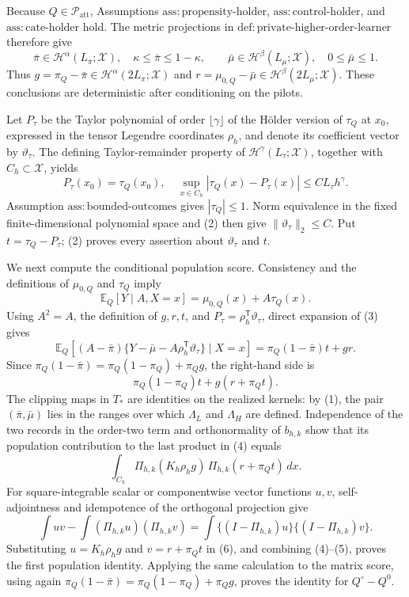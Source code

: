 Because \(Q\in\mathcal P_{\mathrm{att}}\), Assumptions \(\mathrm{ass{:}propensity\text{-}holder}\), \(\mathrm{ass{:}control\text{-}holder}\), and \(\mathrm{ass{:}cate\text{-}holder}\) hold.  The metric projections in \(\mathrm{def{:}private\text{-}higher\text{-}order\text{-}learner}\) therefore give
\[
 \bar\pi\in\mathcal H^\alpha(L_\pi;\mathcal X),\quad
 \kappa\le\bar\pi\le1-\kappa,
 \qquad
 \bar\mu\in\mathcal H^\beta(L_\mu;\mathcal X),\quad
 0\le\bar\mu\le1.
\tag{1}
\]
Thus \(g=\pi_Q-\bar\pi\in\mathcal H^\alpha(2L_\pi;\mathcal X)\) and \(r=\mu_{0,Q}-\bar\mu\in\mathcal H^\beta(2L_\mu;\mathcal X)\).  These conclusions are deterministic after conditioning on the pilots.

Let \(P_\tau\) be the Taylor polynomial of order \(\lfloor\gamma\rfloor\) of the H\"older version of \(\tau_Q\) at \(x_0\), expressed in the tensor Legendre coordinates \(\rho_h\), and denote its coefficient vector by \(\vartheta_\tau\).  The defining Taylor-remainder property of \(\mathcal H^\gamma(L_\tau;\mathcal X)\), together with \(C_h\subset\mathcal X\), yields
\[
 P_\tau(x_0)=\tau_Q(x_0),\quad
 \sup_{x\in C_h}|\tau_Q(x)-P_\tau(x)|\le C L_\tau h^\gamma.
\tag{2}
\]
Assumption \(\mathrm{ass{:}bounded\text{-}outcomes}\) gives \(|\tau_Q|\le1\).  Norm equivalence in the fixed finite-dimensional polynomial space and (2) then give \(\lVert\vartheta_\tau\rVert_2\le C\).  Put \(t=\tau_Q-P_\tau\); (2) proves every assertion about \(\vartheta_\tau\) and \(t\).

We next compute the conditional population score.  Consistency and the definitions of \(\mu_{0,Q}\) and \(\tau_Q\) imply
\[
 \mathbb E_Q[Y\mid A,X=x]=\mu_{0,Q}(x)+A\tau_Q(x).
\tag{3}
\]
Using \(A^2=A\), the definition of \(g,r,t\), and \(P_\tau=\rho_h^{\mathsf T}\vartheta_\tau\), direct expansion of (3) gives
\[
 \mathbb E_Q\!\left[(A-\bar\pi)
       \{Y-\bar\mu-A\rho_h^{\mathsf T}\vartheta_\tau\}\mid X=x\right]
 =\pi_Q(1-\bar\pi)t+gr.
\]
Since \(\pi_Q(1-\bar\pi)=\pi_Q(1-\pi_Q)+\pi_Qg\), the right-hand side is
\[
 \pi_Q(1-\pi_Q)t+g(r+\pi_Qt).
\tag{4}
\]
The clipping maps in \(T_*\) are identities on the realized kernels: by (1), the pair \((\bar\pi,\bar\mu)\) lies in the ranges over which \(\Lambda_L\) and \(\Lambda_H\) are defined.  Independence of the two records in the order-two term and orthonormality of \(b_{h,k}\) show that its population contribution to the last product in (4) equals
\[
 \int_{C_h}\Pi_{h,k}(K_h\rho_hg)\,
                  \Pi_{h,k}(r+\pi_Qt)\,dx.
\tag{5}
\]
For square-integrable scalar or componentwise vector functions \(u,v\), self-adjointness and idempotence of the orthogonal projection give
\[
 \int uv-\int(\Pi_{h,k}u)(\Pi_{h,k}v)
 =\int\{(I-\Pi_{h,k})u\}\{(I-\Pi_{h,k})v\}.
\tag{6}
\]
Substituting \(u=K_h\rho_hg\) and \(v=r+\pi_Qt\) in (6), and combining (4)--(5), proves the first population identity.  Applying the same calculation to the matrix score, using again \(\pi_Q(1-\bar\pi)=\pi_Q(1-\pi_Q)+\pi_Qg\), proves the identity for \(Q^\circ-Q^0\).

